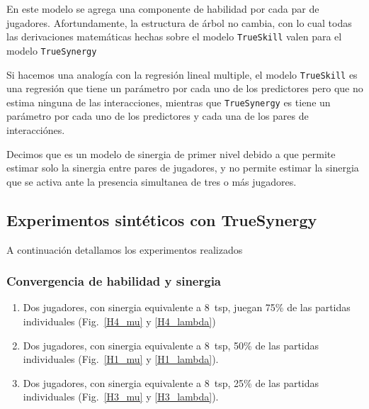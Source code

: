 \documentclass[a4paper,11pt]{book}
\theoremstyle{definition}
\begin{document}
En este modelo se agrega una componente de habilidad por cada par de jugadores.
Afortundamente, la estructura de \'arbol no cambia, con lo cual todas las derivaciones matem\'aticas hechas sobre el modelo \texttt{TrueSkill} valen para el modelo \texttt{TrueSynergy}

Si hacemos una analog\'ia con la regresi\'on lineal multiple, el modelo \texttt{TrueSkill} es una regresi\'on que tiene un par\'ametro por cada uno de los predictores pero que no estima ninguna de las interacciones, mientras que \texttt{TrueSynergy} es tiene un par\'ametro por cada uno de los predictores y cada una de los pares de interacci\'ones.

Decimos que es un modelo de sinergia de primer nivel debido a que permite estimar solo la sinergia entre pares de jugadores, y no permite estimar la sinergia que se activa ante la presencia simultanea de tres o m\'as jugadores.

\subsection{Experimentos sint\'eticos con TrueSynergy}

A continuaci\'on detallamos los experimentos realizados

\subsubsection{Convergencia de habilidad y sinergia}
\begin{enumerate}
 
 \item Dos jugadores, con sinergia equivalente a $8$~tsp, juegan 75\% de las partidas individuales (Fig.~\ref{H4_mu} y \ref{H4_lambda})
 
 \item Dos jugadores, con sinergia equivalente a $8$~tsp, 50\% de las partidas individuales (Fig.~\ref{H1_mu} y \ref{H1_lambda}).
  
 \item Dos jugadores, con sinergia equivalente a $8$~tsp, 25\% de las partidas individuales (Fig.~\ref{H3_mu} y \ref{H3_lambda}).
  
\end{enumerate}
\end{document}
